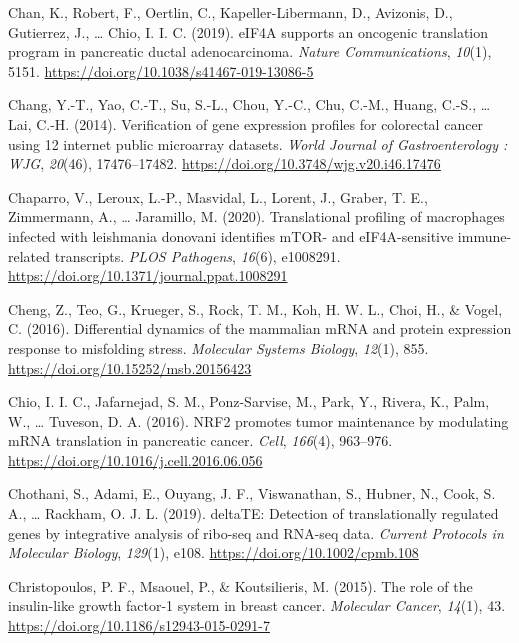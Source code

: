 \documentclass[12pt,openany]{book}
\begin{document}
\hypertarget{ref-Chan2019}{}
Chan, K., Robert, F., Oertlin, C., Kapeller-Libermann, D., Avizonis, D.,
Gutierrez, J., \ldots{} Chio, I. I. C. (2019). eIF4A supports an
oncogenic translation program in pancreatic ductal adenocarcinoma.
\emph{Nature Communications}, \emph{10}(1), 5151.
\url{https://doi.org/10.1038/s41467-019-13086-5}

\hypertarget{ref-Chang2014}{}
Chang, Y.-T., Yao, C.-T., Su, S.-L., Chou, Y.-C., Chu, C.-M., Huang,
C.-S., \ldots{} Lai, C.-H. (2014). Verification of gene expression
profiles for colorectal cancer using 12 internet public microarray
datasets. \emph{World Journal of Gastroenterology : WJG}, \emph{20}(46),
17476--17482. \url{https://doi.org/10.3748/wjg.v20.i46.17476}

\hypertarget{ref-Chaparro2020}{}
Chaparro, V., Leroux, L.-P., Masvidal, L., Lorent, J., Graber, T. E.,
Zimmermann, A., \ldots{} Jaramillo, M. (2020). Translational profiling
of macrophages infected with leishmania donovani identifies mTOR- and
eIF4A-sensitive immune-related transcripts. \emph{PLOS Pathogens},
\emph{16}(6), e1008291.
\url{https://doi.org/10.1371/journal.ppat.1008291}

\hypertarget{ref-Cheng2016}{}
Cheng, Z., Teo, G., Krueger, S., Rock, T. M., Koh, H. W. L., Choi, H.,
\& Vogel, C. (2016). Differential dynamics of the mammalian mRNA and
protein expression response to misfolding stress. \emph{Molecular
Systems Biology}, \emph{12}(1), 855.
\url{https://doi.org/10.15252/msb.20156423}

\hypertarget{ref-Chio2016}{}
Chio, I. I. C., Jafarnejad, S. M., Ponz-Sarvise, M., Park, Y., Rivera,
K., Palm, W., \ldots{} Tuveson, D. A. (2016). NRF2 promotes tumor
maintenance by modulating mRNA translation in pancreatic cancer.
\emph{Cell}, \emph{166}(4), 963--976.
\url{https://doi.org/10.1016/j.cell.2016.06.056}

\hypertarget{ref-Chothani2019}{}
Chothani, S., Adami, E., Ouyang, J. F., Viswanathan, S., Hubner, N.,
Cook, S. A., \ldots{} Rackham, O. J. L. (2019). deltaTE: Detection of
translationally regulated genes by integrative analysis of ribo-seq and
RNA-seq data. \emph{Current Protocols in Molecular Biology},
\emph{129}(1), e108. \url{https://doi.org/10.1002/cpmb.108}

\hypertarget{ref-Christopoulos2015}{}
Christopoulos, P. F., Msaouel, P., \& Koutsilieris, M. (2015). The role
of the insulin-like growth factor-1 system in breast cancer.
\emph{Molecular Cancer}, \emph{14}(1), 43.
\url{https://doi.org/10.1186/s12943-015-0291-7}
\end{document}
